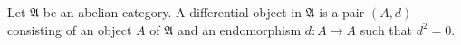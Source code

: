 Let $\mathfrak{A}$ be an abelian category. A differential object in $\mathfrak{A}$ is a pair $(A, d)$ consisting of an object $A$ of $\mathfrak{A}$ and an endomorphism $d : A \to A$ such that $d^2 = 0$.
